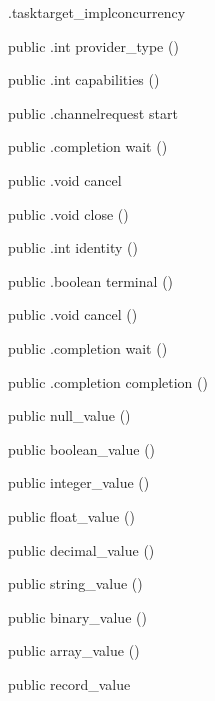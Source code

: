 \begin{CrexxClass}{.tasktarget\_impl}{concurrency}
\begin{Members}
    \Method
      {public}
      {.int}
      {provider\_type}
      {()}

    \Method
      {public}
      {.int}
      {capabilities}
      {()}

    \Method
      {public}
      {.channelrequest}
      {start}
      {}

    \Method
      {public}
      {.completion}
      {wait}
      {()}

    \Method
      {public}
      {.void}
      {cancel}
      {}

    \Method
      {public}
      {.void}
      {close}
      {()}

    \Method
      {public}
      {.int}
      {identity}
      {()}

    \Method
      {public}
      {.boolean}
      {terminal}
      {()}

    \Method
      {public}
      {.void}
      {cancel}
      {()}

    \Method
      {public}
      {.completion}
      {wait}
      {()}

    \Method
      {public}
      {.completion}
      {completion}
      {()}

    \Factory
      {public}
      {null\_value}
      {()}

    \Factory
      {public}
      {boolean\_value}
      {()}

    \Factory
      {public}
      {integer\_value}
      {()}

    \Factory
      {public}
      {float\_value}
      {()}

    \Factory
      {public}
      {decimal\_value}
      {()}

    \Factory
      {public}
      {string\_value}
      {()}

    \Factory
      {public}
      {binary\_value}
      {()}

    \Factory
      {public}
      {array\_value}
      {()}

    \Factory
      {public}
      {record\_value}
      {}


\end{Members}
\end{CrexxClass}
